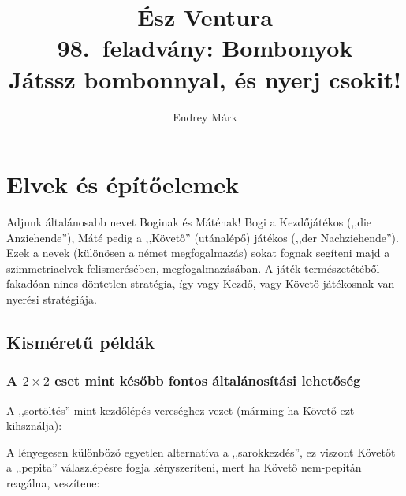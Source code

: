 \documentclass{article}
\author{Endrey Márk}
\title{Ész Ventura\\98.~feladvány: Bombonyok\\\large Játssz bombonnyal, és nyerj csokit!}
\newcommand{\anz}[1]{$\mathrm{I}_{#1}$}
\newcommand{\nch}[1]{$\mathrm{II}_{#1}$}
\begin{document}
	\maketitle
	\tableofcontents
	\section{Elvek és építőelemek}
		Adjunk általánosabb nevet Boginak és Máténak! Bogi a Kezdőjátékos (,,die Anziehende''), Máté pedig a ,,Követő'' (utánalépő) játékos (,,der Nachziehende'').
		Ezek a nevek (különösen a német megfogalmazás) sokat fognak segíteni majd a szimmetriaelvek felismerésében, megfogalmazásában.
		A játék természetétéből fakadóan nincs döntetlen stratégia, így vagy Kezdő, vagy Követő játékosnak van nyerési stratégiája.
		\subsection{Kisméretű példák}
			\subsubsection{A $2\times2$ eset mint később fontos általánosítási lehetőség}
				A ,,sortöltés'' mint kezdőlépés vereséghez vezet (márming ha Követő ezt kihsználja):\\
				
				A lényegesen különböző egyetlen alternatíva a ,,sarokkezdés'', ez viszont Követőt a ,,pepita'' válaszlépésre fogja kényszeríteni, mert ha Követő nem-pepitán reagálna, veszítene:\\
\end{document}

